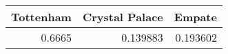 \begin{tabular}{rrr}
\hline
   Tottenham &   Crystal Palace &   Empate \\
\hline
      0.6665 &         0.139883 & 0.193602 \\
\hline
\end{tabular}
